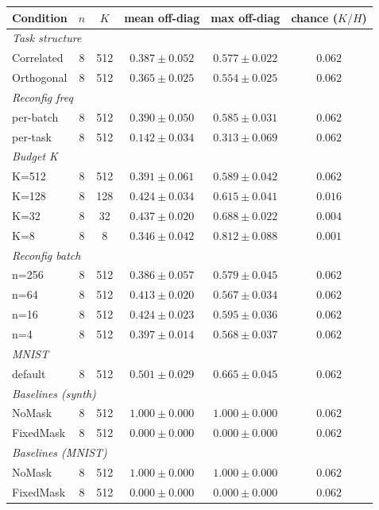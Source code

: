 \begin{tabular}{l c c c c c}
\toprule
Condition & $n$ & $K$ & mean off-diag & max off-diag & chance ($K/H$) \\
\midrule
\multicolumn{6}{l}{\textit{Task structure}} \\
\quad Correlated & 8 & 512 & $0.387 \pm 0.052$ & $0.577 \pm 0.022$ & $0.062$ \\
\quad Orthogonal & 8 & 512 & $0.365 \pm 0.025$ & $0.554 \pm 0.025$ & $0.062$ \\
\midrule
\multicolumn{6}{l}{\textit{Reconfig freq}} \\
\quad per-batch & 8 & 512 & $0.390 \pm 0.050$ & $0.585 \pm 0.031$ & $0.062$ \\
\quad per-task & 8 & 512 & $0.142 \pm 0.034$ & $0.313 \pm 0.069$ & $0.062$ \\
\midrule
\multicolumn{6}{l}{\textit{Budget K}} \\
\quad K=512 & 8 & 512 & $0.391 \pm 0.061$ & $0.589 \pm 0.042$ & $0.062$ \\
\quad K=128 & 8 & 128 & $0.424 \pm 0.034$ & $0.615 \pm 0.041$ & $0.016$ \\
\quad K=32 & 8 & 32 & $0.437 \pm 0.020$ & $0.688 \pm 0.022$ & $0.004$ \\
\quad K=8 & 8 & 8 & $0.346 \pm 0.042$ & $0.812 \pm 0.088$ & $0.001$ \\
\midrule
\multicolumn{6}{l}{\textit{Reconfig batch}} \\
\quad n=256 & 8 & 512 & $0.386 \pm 0.057$ & $0.579 \pm 0.045$ & $0.062$ \\
\quad n=64 & 8 & 512 & $0.413 \pm 0.020$ & $0.567 \pm 0.034$ & $0.062$ \\
\quad n=16 & 8 & 512 & $0.424 \pm 0.023$ & $0.595 \pm 0.036$ & $0.062$ \\
\quad n=4 & 8 & 512 & $0.397 \pm 0.014$ & $0.568 \pm 0.037$ & $0.062$ \\
\midrule
\multicolumn{6}{l}{\textit{MNIST}} \\
\quad default & 8 & 512 & $0.501 \pm 0.029$ & $0.665 \pm 0.045$ & $0.062$ \\
\midrule
\multicolumn{6}{l}{\textit{Baselines (synth)}} \\
\quad NoMask & 8 & 512 & $1.000 \pm 0.000$ & $1.000 \pm 0.000$ & $0.062$ \\
\quad FixedMask & 8 & 512 & $0.000 \pm 0.000$ & $0.000 \pm 0.000$ & $0.062$ \\
\midrule
\multicolumn{6}{l}{\textit{Baselines (MNIST)}} \\
\quad NoMask & 8 & 512 & $1.000 \pm 0.000$ & $1.000 \pm 0.000$ & $0.062$ \\
\quad FixedMask & 8 & 512 & $0.000 \pm 0.000$ & $0.000 \pm 0.000$ & $0.062$ \\
\bottomrule
\end{tabular}
